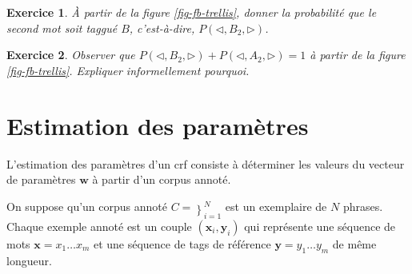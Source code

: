 \documentclass[11pt,openany]{book}
\newtheorem{exo}{Exercice}[chapter]
\newcommand{\ac}[1]{{\sc #1}} %
\begin{document}
\begin{exo}
\`A partir de la figure \ref{fig-fb-trellis},
donner la probabilité que le second mot soit taggué $B$, c'est-à-dire, $P(\lhd,B_2,\rhd)$.
\end{exo}

\begin{exo}
Observer que $P(\lhd,B_2,\rhd) + P(\lhd,A_2,\rhd) = 1$
à partir de la figure \ref{fig-fb-trellis}.
Expliquer informellement pourquoi.
\end{exo}

\section{Estimation des paramètres}

L'estimation des paramètres d'un \ac{crf} consiste à déterminer les valeurs du vecteur de paramètres $\mathbf{w}$ à partir d'un corpus annoté.

On suppose qu'un corpus annoté $C =\mathop{(\mathbf{x}_i,\mathbf{y}_i)\}}_{i=1}^N$ est un exemplaire de $N$ phrases. Chaque exemple annoté est un couple $(\mathbf{x}_i,\mathbf{y}_i)$ qui représente une séquence de mots $\mathbf{x}=x_1\ldots x_m$ et une séquence de tags de référence $\mathbf{y} = y_1\ldots y_m$ de même longueur.
\end{document}
